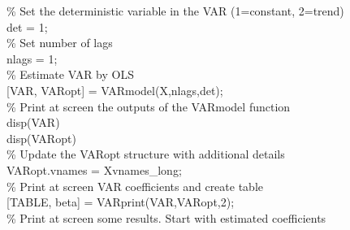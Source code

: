 \hspace{1mm}\hspace{5mm} \hspace{5mm} \textcolor{matlabgreen}{\% Set the deterministic variable in the VAR (1=constant, 2=trend) }\\ 
\hspace{1mm}\hspace{5mm} \hspace{5mm} det = 1; \\ 
\hspace{1mm}\hspace{5mm} \hspace{5mm} \textcolor{matlabgreen}{\% Set number of lags }\\ 
\hspace{1mm}\hspace{5mm} \hspace{5mm} nlags = 1; \\ 
\hspace{1mm}\hspace{5mm} \hspace{5mm} \textcolor{matlabgreen}{\% Estimate VAR by OLS }\\ 
\hspace{1mm}\hspace{5mm} \hspace{5mm} [VAR, VARopt] = VARmodel(X,nlags,det); \\ 
\hspace{1mm}\hspace{5mm} \hspace{5mm} \textcolor{matlabgreen}{\% Print at screen the outputs of the VARmodel \textcolor{matlabblue}{function} }\\ 
\hspace{1mm}disp(VAR) \\ 
\hspace{1mm}disp(VARopt) \\ 
\hspace{1mm}\textcolor{matlabgreen}{\% Update the VARopt structure with additional details }\\ 
\hspace{1mm}VARopt.vnames = Xvnames\_long; \\ 
\hspace{1mm}\textcolor{matlabgreen}{\% Print at screen VAR coefficients and create table  }\\ 
\hspace{1mm}[TABLE, beta] = VARprint(VAR,VARopt,2); \\ 
\hspace{1mm}\textcolor{matlabgreen}{\% Print at screen some results. Start with estimated coefficients }\\ 
